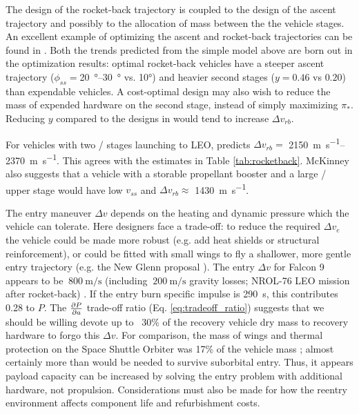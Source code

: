 \documentclass[conf]{new-aiaa}
\begin{document}
The design of the rocket-back trajectory is coupled to the design of the ascent trajectory and possibly to the allocation of mass between the the vehicle stages. An excellent example of optimizing the ascent and rocket-back trajectories can be found in \cite{McKinney1986}. Both the trends predicted from the simple model above are born out in the optimization results: optimal rocket-back vehicles have a steeper ascent trajectory ($\phi_{ss} = $\SIrange{20}{30}{\degree} vs. \ang{10}) and heavier second stages ($y=0.46$ vs $0.20$) than expendable vehicles. A cost-optimal design may also wish to reduce the mass of expended hardware on the second stage, instead of simply maximizing $\pi_*$. Reducing $y$ compared to the designs in \cite{McKinney1986} would tend to increase $\Delta v_{rb}$.

For vehicles with two / stages launching to LEO, \cite{McKinney1986} predicts $\Delta v_{rb} =$ \SIrange{2150}{2370}{\meter\per\second}. This agrees with the estimates in Table \ref{tab:rocketback}. McKinney also suggests that a vehicle with a storable propellant booster and a large / upper stage would have low $v_{ss}$ and $\Delta v_{rb} \approx$ \SI{1430}{\meter\per\second}.

The entry maneuver $\Delta v$ depends on the heating and dynamic pressure which the vehicle can tolerate. Here designers face a trade-off: to reduce the required $\Delta v_e$ the vehicle could be made more robust (e.g. add heat shields or structural reinforcement), or could be fitted with small wings to fly a shallower, more gentle entry trajectory (e.g. the New Glenn proposal \cite{NewGlenn}). The entry $\Delta v$ for Falcon 9 appears to be $~\SI{800}{\meter\per\second}$ (including $~\SI{200}{\meter\per\second}$ gravity losses; NROL-76 LEO mission after rocket-back) \cite{Dumont2017}\cite{SpaceXWebcast}. If the entry burn specific impulse is \SI{290}{\second}, this contributes 0.28 to $P$. The $\pdv{P}{a}$ trade-off ratio (Eq. \ref{eq:tradeoff_ratio}) suggests that we should be willing devote up to ~30\% of the recovery vehicle dry mass to recovery hardware to forgo this $\Delta v$. For comparison, the mass of wings and thermal protection on the Space Shuttle Orbiter was 17\% of the vehicle mass \cite{Sforza2015}; almost certainly more than would be needed to survive suborbital entry. Thus, it appears payload capacity can be increased by solving the entry problem with additional hardware, not propulsion. Considerations must also be made for how the reentry environment affects component life and refurbishment costs.
\end{document}
